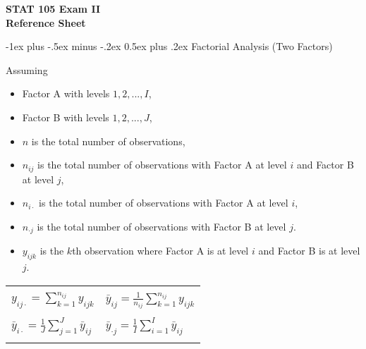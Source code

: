 \documentclass[10pt,landscape]{article}
\makeatletter
\renewcommand{\section}{\@startsection{section}{1}{0mm}%
                                {-1ex plus -.5ex minus -.2ex}%
                                {0.5ex plus .2ex}%
                                {\normalfont\large\bfseries}}
\makeatother
\begin{document}
\raggedright
\footnotesize
\begin{multicols}{2}


\setlength{\premulticols}{1pt}
\setlength{\postmulticols}{1pt}
\setlength{\multicolsep}{1pt}
\setlength{\columnsep}{2pt}

\begin{center}
   \Large{\textbf{STAT 105 Exam II}} \\
   \Large{\textbf{Reference Sheet}} \\
\end{center}

\section{Factorial Analysis (Two Factors)}

Assuming 

\begin{itemize}
   \item Factor A with levels $1, 2, ..., I$, 
   \item Factor B with levels $1, 2, ..., J$, 
   \item $n$ is the total number of observations,
   \item $n_{ij}$ is the total number of observations with Factor A at level $i$ and Factor B at level $j$, 
   \item $n_{i \cdot }$ is the total number of observations with Factor A at level $i$,
   \item $n_{\cdot j}$ is the total number of observations with Factor B at level $j$.
   \item $y_{ijk}$ is the $k$th observation where Factor A is at level $i$ and Factor B is at level $j$.
\end{itemize}

\begin{center}
\begin{tabular}{@{}ll@{}}
        & \\
   $y_{i j \cdot} = \sum_{k = 1}^{n_{ij}} y_{ijk} $ & $\bar{y}_{i j} = \frac{1}{n_{ij}} \sum_{k = 1}^{n_{ij}} y_{ijk} $ \\
        & \\
   $\bar{y}_{i \cdot} = \frac{1}{J} \sum_{j = 1}^J \bar{y}_{ij} $ & $\bar{y}_{\cdot j} = \frac{1}{I} \sum_{i = 1}^I \bar{y}_{ij} $ \\
        & \\
\end{tabular}
\end{center}


\end{multicols}
\end{document}
